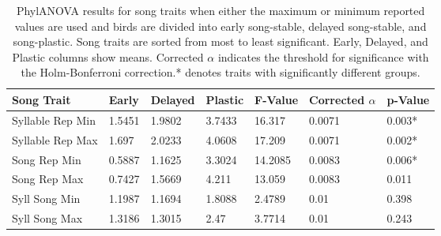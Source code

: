\documentclass[a4paper,12pt]{article}
\begin{document}
\begin{table}[ht]
\caption{PhylANOVA results for song traits when either the maximum or minimum reported values are used and birds are divided into early song-stable, delayed song-stable, and song-plastic. Song traits are sorted from most to least significant. Early, Delayed, and Plastic columns show means. Corrected $\alpha$ indicates the threshold for significance with the Holm-Bonferroni correction.* denotes traits with significantly different groups.}
\centering
\begin{tabular}{lllllll}
  \hline
Song Trait & Early & Delayed & Plastic & F-Value & Corrected $\alpha$ & p-Value \\ 
  \hline
Syllable Rep Min & 1.5451 & 1.9802 & 3.7433 & 16.317 & 0.0071 & 0.003* \\ 
  Syllable Rep Max & 1.697 & 2.0233 & 4.0608 & 17.209 & 0.0071 & 0.002* \\ 
  Song Rep Min & 0.5887 & 1.1625 & 3.3024 & 14.2085 & 0.0083 & 0.006* \\ 
  Song Rep Max & 0.7427 & 1.5669 & 4.211 & 13.059 & 0.0083 & 0.011 \\ 
  Syll Song Min & 1.1987 & 1.1694 & 1.8088 & 2.4789 & 0.01 & 0.398 \\ 
  Syll Song Max & 1.3186 & 1.3015 & 2.47 & 3.7714 & 0.01 & 0.243 \\ 
   \hline
\end{tabular}
\end{table}
\end{document}
